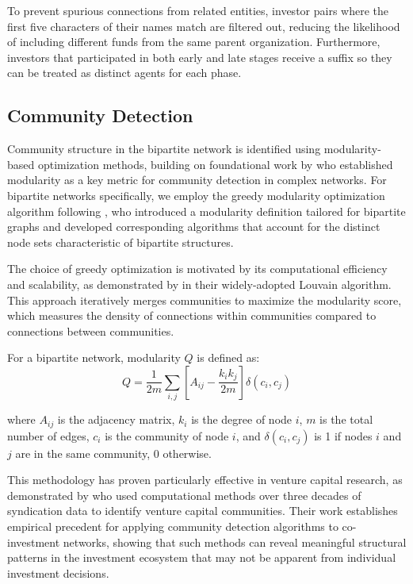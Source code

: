 To prevent spurious connections from related entities, investor pairs where the first five characters of their names match are filtered out, reducing the likelihood of including different funds from the same parent organization. Furthermore, investors that participated in both early and late stages receive a suffix so they can be treated as distinct agents for each phase.

\subsection{Community Detection}

Community structure in the bipartite network is identified using modularity-based optimization methods, building on foundational work by \cite{Newman2006} who established modularity as a key metric for community detection in complex networks. For bipartite networks specifically, we employ the greedy modularity optimization algorithm following \cite{Barber2007}, who introduced a modularity definition tailored for bipartite graphs and developed corresponding algorithms that account for the distinct node sets characteristic of bipartite structures.

The choice of greedy optimization is motivated by its computational efficiency and scalability, as demonstrated by \cite{Blondel2008} in their widely-adopted Louvain algorithm. This approach iteratively merges communities to maximize the modularity score, which measures the density of connections within communities compared to connections between communities.

For a bipartite network, modularity $Q$ is defined as:
\begin{equation}
Q = \frac{1}{2m} \sum_{i,j} \left[ A_{ij} - \frac{k_i k_j}{2m} \right] \delta(c_i, c_j)
\end{equation}

where $A_{ij}$ is the adjacency matrix, $k_i$ is the degree of node $i$, $m$ is the total number of edges, $c_i$ is the community of node $i$, and $\delta(c_i, c_j)$ is 1 if nodes $i$ and $j$ are in the same community, 0 otherwise.

This methodology has proven particularly effective in venture capital research, as demonstrated by \cite{Bubna2020} who used computational methods over three decades of syndication data to identify venture capital communities. Their work establishes empirical precedent for applying community detection algorithms to co-investment networks, showing that such methods can reveal meaningful structural patterns in the investment ecosystem that may not be apparent from individual investment decisions.

